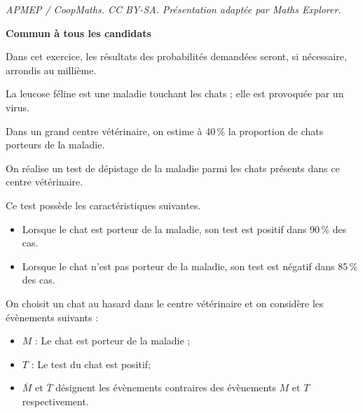 \documentclass[10pt]{article}
\begin{document}
\noindent\textit{APMEP / CoopMaths. CC BY-SA. Présentation adaptée par Maths Explorer.}\par\medskip
\textbf{Commun à tous les candidats}

\medskip

Dans cet exercice, les résultats des probabilités demandées seront, si nécessaire, arrondis au millième.

La leucose féline est une maladie touchant les chats ; elle est provoquée par un virus.

Dans un grand centre vétérinaire, on estime à 40\,\% la proportion de chats porteurs de la maladie.

On réalise un test de dépistage de la maladie parmi les chats présents dans ce centre vétérinaire.

Ce test possède les caractéristiques suivantes.

\setlength\parindent{9mm}
\begin{itemize}
\item[$\bullet~~$] Lorsque le chat est porteur de la maladie, son test est positif dans 90\,\% des cas.
\item[$\bullet~~$] Lorsque le chat n'est pas porteur de la maladie, son test est négatif dans 85\,\% des cas.
\end{itemize}
\setlength\parindent{0mm}

On choisit un chat au hasard dans le centre vétérinaire et on considère les évènements suivants :

\setlength\parindent{9mm}
\begin{itemize}
\item[$\bullet~~$] $M$ : \og Le chat est porteur de la maladie\fg{} ;
\item[$\bullet~~$] $T$ : \og Le test du chat est positif\fg ;
\item[$\bullet~~$] $\overline{M}$ et $\overline{T}$ désignent les évènements contraires des évènements $M$ et $T$ respectivement.
\end{itemize}
\setlength\parindent{0mm}

\medskip
\end{document}

